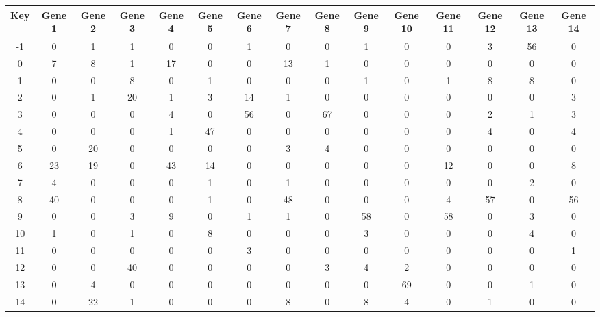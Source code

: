 \begin{tabular}{|c|c|c|c|c|c|c|c|c|c|c|c|c|c|c|}
\hline
Key & Gene 1 & Gene 2 & Gene 3 & Gene 4 & Gene 5 & Gene 6 & Gene 7 & Gene 8 & Gene 9 & Gene 10 & Gene 11 & Gene 12 & Gene 13 & Gene 14 \\
\hline
-1 & 0 & 1 & 1 & 0 & 0 & 1 & 0 & 0 & 1 & 0 & 0 & 3 & 56 & 0 \\
0 & 7 & 8 & 1 & 17 & 0 & 0 & 13 & 1 & 0 & 0 & 0 & 0 & 0 & 0 \\
1 & 0 & 0 & 8 & 0 & 1 & 0 & 0 & 0 & 1 & 0 & 1 & 8 & 8 & 0 \\
2 & 0 & 1 & 20 & 1 & 3 & 14 & 1 & 0 & 0 & 0 & 0 & 0 & 0 & 3 \\
3 & 0 & 0 & 0 & 4 & 0 & 56 & 0 & 67 & 0 & 0 & 0 & 2 & 1 & 3 \\
4 & 0 & 0 & 0 & 1 & 47 & 0 & 0 & 0 & 0 & 0 & 0 & 4 & 0 & 4 \\
5 & 0 & 20 & 0 & 0 & 0 & 0 & 3 & 4 & 0 & 0 & 0 & 0 & 0 & 0 \\
6 & 23 & 19 & 0 & 43 & 14 & 0 & 0 & 0 & 0 & 0 & 12 & 0 & 0 & 8 \\
7 & 4 & 0 & 0 & 0 & 1 & 0 & 1 & 0 & 0 & 0 & 0 & 0 & 2 & 0 \\
8 & 40 & 0 & 0 & 0 & 1 & 0 & 48 & 0 & 0 & 0 & 4 & 57 & 0 & 56 \\
9 & 0 & 0 & 3 & 9 & 0 & 1 & 1 & 0 & 58 & 0 & 58 & 0 & 3 & 0 \\
10 & 1 & 0 & 1 & 0 & 8 & 0 & 0 & 0 & 3 & 0 & 0 & 0 & 4 & 0 \\
11 & 0 & 0 & 0 & 0 & 0 & 3 & 0 & 0 & 0 & 0 & 0 & 0 & 0 & 1 \\
12 & 0 & 0 & 40 & 0 & 0 & 0 & 0 & 3 & 4 & 2 & 0 & 0 & 0 & 0 \\
13 & 0 & 4 & 0 & 0 & 0 & 0 & 0 & 0 & 0 & 69 & 0 & 0 & 1 & 0 \\
14 & 0 & 22 & 1 & 0 & 0 & 0 & 8 & 0 & 8 & 4 & 0 & 1 & 0 & 0 \\
\hline
\end{tabular}